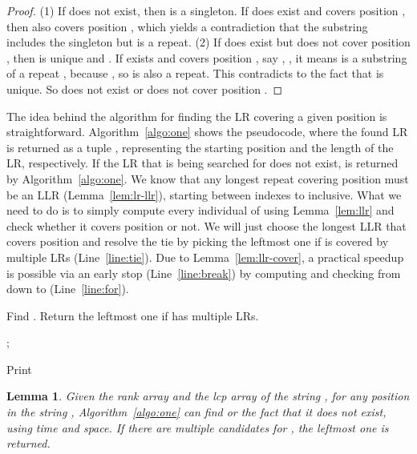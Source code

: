 \documentclass[preprint]{elsarticle}
\newtheorem{lemma}{Lemma}[section]
\begin{document}
\begin{proof}
  (1) If  does not exist, then  is a singleton.  If
   does exist and covers position , then  also covers
 position , which yields a contradiction that 
  the substring  includes the singleton  but is a repeat. 
(2) If  does exist but does not cover position
  , then  is unique and . If 
  exists and covers position , say , 
  , it means  is a substring of a repeat
  , because , so 
  is also a repeat. This contradicts to the fact that
   is unique. So    does not exist or does not
  cover position . 
\end{proof}

The idea behind the algorithm for finding the LR covering a given
position is straightforward.  Algorithm~\ref{algo:one} shows the
pseudocode, where the found LR is returned as a tuple
, representing the starting position and the length of
the LR, respectively. 
If the LR that is being searched for does not
exist,  is returned by Algorithm~\ref{algo:one}.
 We know that any longest repeat covering
position  must be an LLR (Lemma~\ref{lem:lr-llr}), starting between
indexes  to  inclusive.
What we need to do is to simply compute every individual of  using Lemma~\ref{lem:llr} and check whether it covers
position  or not.  We will just choose the longest LLR that covers
position  and resolve the tie by picking the leftmost one if  is
covered by multiple LRs (Line~\ref{line:tie}).
Due to Lemma~\ref{lem:llr-cover}, a practical speedup is possible via
an early stop (Line~\ref{line:break}) by computing and checking from
 down to  (Line~\ref{line:for}). 
   
\begin{algorithm}[t]
{\small
  \caption{Find . Return the leftmost one if  has multiple LRs.}
\label{algo:one}

\smallskip 

;  

Print \;
}\end{algorithm}


\begin{lemma}
\label{lem:one}
Given the rank array and the lcp
array of the string ,
for any position  in the string , Algorithm~\ref{algo:one} 
can find  or the
fact that it does not exist, using
 time and  space.  If there are multiple candidates for
, the leftmost one is returned.
 \end{lemma}
\end{document}
